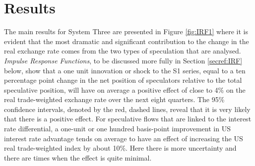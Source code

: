 \documentclass[12pt, a4paper, oneside]{article}\usepackage[]{graphicx}\usepackage[]{color}
\begin{document}

\section{Results}\label{secref:varresults}
The main results for System Three are presented in Figure \ref{fig:IRF1} where it is evident that the most dramatic and significant contribution to the change in the real exchange rate comes from the two types of speculation that are analysed.  \emph{Impulse Response Functions}, to be discussed more fully in Section \ref{secref:IRF} below, show that a one unit innovation or shock to the S1 series, equal to a ten percentage point change in the net position of speculators relative to the total speculative position, will have on average a positive effect of close to 4\% on the real trade-weighted exchange rate over the next eight quarters.  The 95\% confidence intervals, denoted by the red, dashed lines, reveal that it is very likely that there is a positive effect.  For speculative flows that are linked to the interest rate differential, a one-unit or one hundred basis-point improvement in US interest rate advantage tends on average to have an effect of increasing the US real trade-weighted index by about 10\%.  Here there is more uncertainty and there are times when the effect is quite minimal. 
\end{document}

